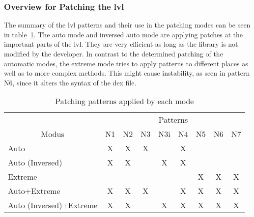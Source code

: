 \subsubsection{Overview for Patching the \gls{lvl}}
The summary of the \gls{lvl} patterns and their use in the patching modes can be seen in table~\ref{table:patterns}.
The auto mode and inversed auto mode are applying patches at the important parts of the \gls{lvl}.
They are very efficient as long as the library is not modified by the developer.
\newline
In contrast to the determined patching of the automatic modes, the extreme mode tries to apply patterns to different places as well as to more complex methods.
This might cause instability, as seen in pattern N6, since it alters the syntax of the dex file.
\begin{table}[h]
\centering
\begin{tabular}{l|cccccccc}
                           & \multicolumn{8}{c}{Patterns}           \\
\multicolumn{1}{c|}{Modus} & N1 & N2 & N3 & N3i & N4 & N5 & N6 & N7 \\ \hline
Auto                       & X  & X  & X  &     & X  &    &    &    \\
Auto (Inversed)            & X  & X  &    & X   & X  &    &    &    \\
Extreme                    &    &    &    &     &    & X  & X  & X  \\
Auto+Extreme               & X  & X  & X  &     & X  & X  & X  & X  \\
Auto (Inversed)+Extreme    & X  & X  &    & X   & X  & X  & X  & X
\end{tabular}
\caption{Patching patterns applied by each mode}
\label{table:patterns}
\end{table}



